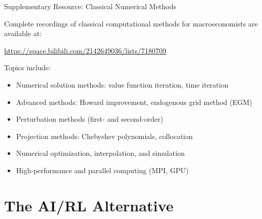 \documentclass[10pt,english,aspectratio=169]{beamer}
\begin{document}

\begin{frame}{Supplementary Resource: Classical Numerical Methods}
\begin{tcolorbox}[colback=blue!3, colframe=blue!40, title=Video Lecture Series]
Complete recordings of classical computational methods for macroeconomists are available at:
\begin{center}
\url{https://space.bilibili.com/2142649036/lists/7180709}
\end{center}
\medskip
Topics include:
\begin{itemize}
  \item Numerical solution methods: value function iteration, time iteration
  \item Advanced methods: Howard improvement, endogenous grid method (EGM)
  \item Perturbation methods (first- and second-order)
  \item Projection methods: Chebyshev polynomials, collocation
  \item Numerical optimization, interpolation, and simulation
  \item High-performance and parallel computing (MPI, GPU)
\end{itemize}
\end{tcolorbox}
\end{frame}


\section{The AI/RL Alternative}
\end{document}
